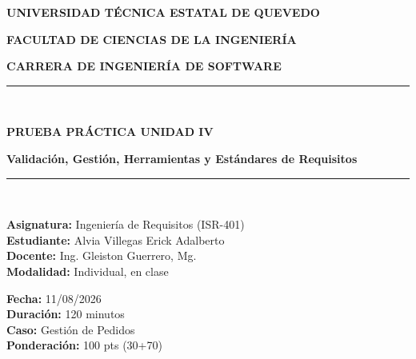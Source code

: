 \documentclass[12pt,a4paper]{article}
\begin{document}
\begin{titlepage}
    \centering
    {\bfseries\Large UNIVERSIDAD TÉCNICA ESTATAL DE QUEVEDO \par}
    \vspace{0.2cm}
    {\bfseries\large FACULTAD DE CIENCIAS DE LA INGENIERÍA \par}
    {\bfseries\large CARRERA DE INGENIERÍA DE SOFTWARE \par}
    \vspace{0.4cm}
    
    \rule{\linewidth}{0.5mm} \\[0.3cm]
    {\huge\bfseries PRUEBA PRÁCTICA UNIDAD IV \par}
    \vspace{0.2cm}
    {\large\bfseries Validación, Gestión, Herramientas y Estándares de Requisitos \par}
    \rule{\linewidth}{0.5mm} \\[0.6cm]
    
    \begin{minipage}{0.48\textwidth}
        \begin{flushleft} \large
            \textbf{Asignatura:} Ingeniería de Requisitos (ISR-401)\\
            \textbf{Estudiante:} Alvia Villegas Erick Adalberto\\
            \textbf{Docente:} Ing. Gleiston Guerrero, Mg.\\
            \textbf{Modalidad:} Individual, en clase
        \end{flushleft}
    \end{minipage}
    \begin{minipage}{0.48\textwidth}
        \begin{flushright} \large
            \textbf{Fecha:} 11/08/2026\\
            \textbf{Duración:} 120 minutos\\
            \textbf{Caso:} Gestión de Pedidos\\
            \textbf{Ponderación:} 100 pts (30+70)
        \end{flushright}
    \end{minipage}
    
    \vspace{0.5cm}
    
    

\end{titlepage}
\end{document}
